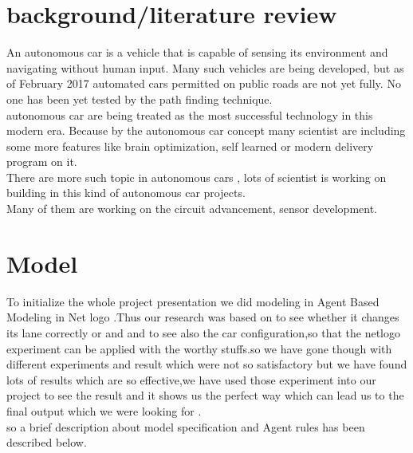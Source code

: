 \documentclass[conference]{IEEEtran}
\begin{document}
\section{background/literature review}
An autonomous car is a vehicle that is capable of sensing its environment and navigating without human input. Many such vehicles are being developed, but as of February 2017 automated cars permitted on public roads are not yet fully. No one has been yet tested by the path finding technique. \\
autonomous car are being treated as the most successful technology in this modern era. Because by the autonomous car concept many scientist are including some more features like brain optimization, self learned or modern delivery program on it.\\ 
There are more such topic in autonomous cars , lots of scientist is working on building in this kind of autonomous car projects.\\
Many of them are working on the circuit advancement, sensor development.  \\


\section{Model}
To initialize the whole project presentation we did modeling in Agent Based Modeling in Net logo .Thus our research was based on to see whether it changes its lane correctly or and and to see also the car configuration,so that the netlogo experiment can be applied with the worthy stuffs.so we have gone though with different experiments and result which were not so satisfactory but we have found lots of results which are so effective,we have used those experiment into our project to see the result and it shows us the perfect way which can lead us to the final output which we were looking for .   \\
so a brief description about model specification and Agent rules has been described below.  
\end{document}
